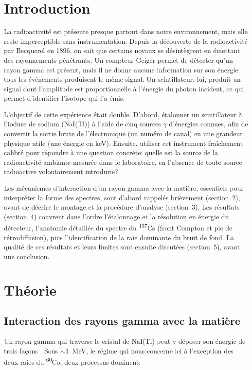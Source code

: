 \documentclass[11pt,letterpaper]{article}
\begin{document}
\section{Introduction}

La radioactivité est présente presque partout dans notre environnement, mais elle reste imperceptible sans instrumentation. Depuis la découverte de la radioactivité par Becquerel en 1896, on sait que certains noyaux se désintègrent en émettant des rayonnements pénétrants. Un compteur Geiger permet de détecter qu'un rayon gamma est présent, mais il ne donne aucune information sur son énergie: tous les événements produisent le même signal. Un scintillateur, lui, produit un signal dont l'amplitude est proportionnelle à l'énergie du photon incident, ce qui permet d'identifier l'isotope qui l'a émis.

L'objectif de cette expérience était double. D'abord, étalonner un scintillateur à l'iodure de sodium (NaI(Tl)) à l'aide de cinq sources $\gamma$ d'énergies connues, afin de convertir la sortie brute de l'électronique (un numéro de canal) en une grandeur physique utile (une énergie en keV). Ensuite, utiliser cet instrument fraîchement calibré pour répondre à une question concrète: quelle est la source de la radioactivité ambiante mesurée dans le laboratoire, en l'absence de toute source radioactive volontairement introduite?

Les mécanismes d'interaction d'un rayon gamma avec la matière, essentiels pour interpréter la forme des spectres, sont d'abord rappelés brièvement (section~2), avant de décrire le montage et la procédure d'analyse (section~3). Les résultats (section~4) couvrent dans l'ordre l'étalonnage et la résolution en énergie du détecteur, l'anatomie détaillée du spectre du \textsuperscript{137}Cs (front Compton et pic de rétrodiffusion), puis l'identification de la raie dominante du bruit de fond. La qualité de ces résultats et leurs limites sont ensuite discutées (section~5), avant une conclusion.

\section{Théorie}

\subsection{Interaction des rayons gamma avec la matière}

Un rayon gamma qui traverse le cristal de NaI(Tl) peut y déposer son énergie de trois façons \cite{knoll}. Sous $\sim$1~MeV, le régime qui nous concerne ici à l'exception des deux raies du \textsuperscript{60}Co, deux processus dominent:
\end{document}
